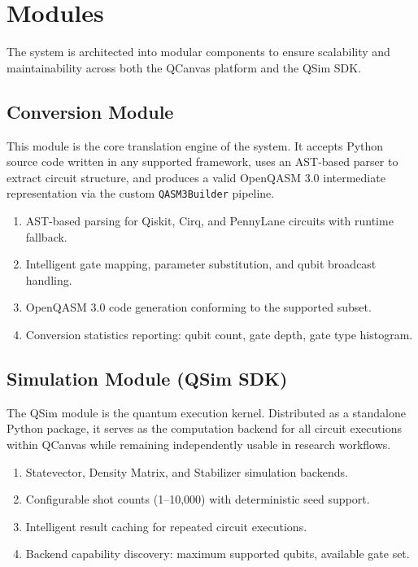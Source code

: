 \section{Modules}

The system is architected into modular components to ensure scalability and maintainability across both the QCanvas platform and the QSim SDK.

\subsection{Conversion Module}
This module is the core translation engine of the system. It accepts Python source code written in any supported framework, uses an AST-based parser to extract circuit structure, and produces a valid OpenQASM 3.0 intermediate representation via the custom \texttt{QASM3Builder} pipeline.
\begin{enumerate}
    \item AST-based parsing for Qiskit, Cirq, and PennyLane circuits with runtime fallback.
    \item Intelligent gate mapping, parameter substitution, and qubit broadcast handling.
    \item OpenQASM 3.0 code generation conforming to the supported subset.
    \item Conversion statistics reporting: qubit count, gate depth, gate type histogram.
\end{enumerate}

\subsection{Simulation Module (QSim SDK)}
The QSim module is the quantum execution kernel. Distributed as a standalone Python package, it serves as the computation backend for all circuit executions within QCanvas while remaining independently usable in research workflows.
\begin{enumerate}
    \item Statevector, Density Matrix, and Stabilizer simulation backends.
    \item Configurable shot counts (1--10,000) with deterministic seed support.
    \item Intelligent result caching for repeated circuit executions.
    \item Backend capability discovery: maximum supported qubits, available gate set.
\end{enumerate}

